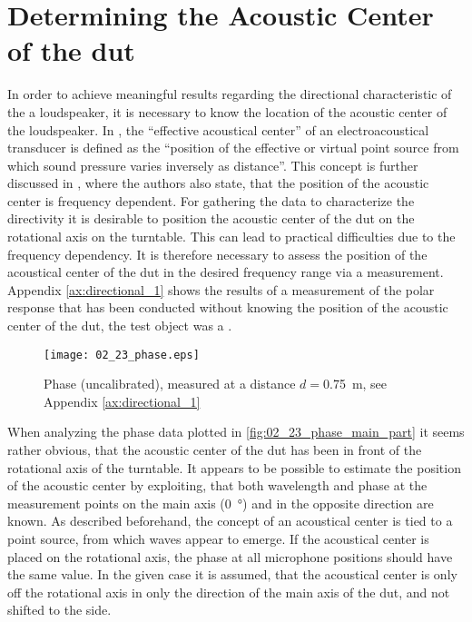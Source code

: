 \section{Determining the Acoustic Center of the \gls{dut}}\label{sec:ac_center}
In order to achieve meaningful results regarding the directional characteristic of the a loudspeaker, it is necessary to know the location of the  acoustic center of the loudspeaker.
In \citep{ansis1.1}, the ``effective acoustical center'' of an electroacoustical transducer is defined as the ``position of the effective or virtual point source from which sound pressure varies inversely as distance''. This concept is further discussed in \citep{jacobsenetal}, where the authors also state, that the position of the acoustic center is frequency dependent. For gathering the data to characterize the directivity it is desirable to position the acoustic center of the \gls{dut} on the rotational axis on the turntable. This can lead to practical difficulties due to the frequency dependency. It is therefore necessary to assess the position of the acoustical center of the \gls{dut} in the desired frequency range via a measurement.\\
Appendix \ref{ax:directional_1} shows the results of a measurement of the polar response that has been conducted without knowing the position of the acoustic center of the \gls{dut}, the test object was a \citep{seas33}. 
\begin{figure}[htbp]
	\centering
	\texttt{[image: 02\_23\_phase.eps]}
	\caption{Phase (uncalibrated), measured at a distance \(d=\)\SI{0.75}{\meter}, see Appendix \ref{ax:directional_1}}
		\label{fig:02_23_phase_main_part}
\end{figure}
When analyzing the phase data plotted in \autoref{fig:02_23_phase_main_part} it seems rather obvious, that the acoustic center of the \gls{dut} has been in front of the rotational axis of the turntable. 
It appears to be possible to estimate the position of the acoustic center by exploiting, that both wavelength and phase at the measurement points on the main axis (\SI{0}{\degree}) and in the opposite direction are known. As described beforehand, the concept of an acoustical center is tied to a  point source, from which waves appear to emerge. If the acoustical center is placed  on the rotational axis, the phase at all microphone positions should have the same value. In the given case it is assumed, that the acoustical center is only off the rotational axis in only the direction of the main axis of the \gls{dut}, and not shifted to the side.
